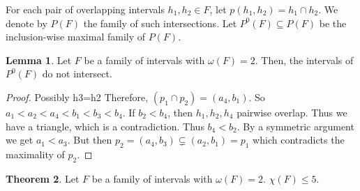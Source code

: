 \documentclass[12pt]{article}
\theoremstyle{definition}
\newtheorem{thm}{Theorem}
\newtheorem{lemma}[thm]{Lemma}
\begin{document}
    For each pair of overlapping
    intervals $h_1, h_2 \in F$,
    let $p\left(h_1, h_2\right)
    = h_1 \cap h_2$.
    We denote by $P\left(F\right)$ 
    the family of such intersections.
    Let $P^{0}\left(F\right) \subseteq 
    P\left(F\right)$ be the
    inclusion-wise maximal family
    of $P\left(F\right)$.

    \begin{lemma} \label{lemma:4.5}
        Let $F$ be a family of
        intervals with $\omega\left(F\right)=2$.
        Then, the intervals of $P^{0}\left(F\right)$ 
        do not intersect.
    \end{lemma}
    \begin{proof}
        {Possibly h3=h2}
        Therefore, $\left(p_1 \cap p_2\right) =
        \left(a_4, b_1\right)$.
        So $a_1 < a_2 < a_4
        < b_1 <b_3 < b_4$.
        If $b_2 < b_4$,
        then $h_1, h_2, h_4$ 
        pairwise overlap. 
        Thus we have a triangle,
        which is a contradiction.
        Thus $b_4 < b_2$.
        By a symmetric argument
        we get $a_1 < a_3$.
        But then $p_2 =
        \left(a_4, b_3\right)
        \subsetneq \left(a_2, b_1\right)
        = p_1$ which contradicts
        the maximality of $p_2$.
    \end{proof}
    \begin{thm}
        Let $F$ be a family of intervals
        with $\omega\left(F\right)=2$.
        $\chi\left(F\right) \leq 5$.         
    \end{thm}        
\end{document}

